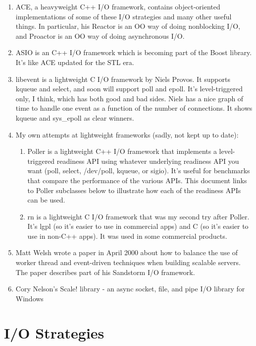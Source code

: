 \documentclass[12pt, twoside, a4paper, xetex]{report}
\begin{document}
	\begin{enumerate}
	
	\item ACE, a heavyweight C++ I/O framework, contains object-oriented implementations of some of these I/O 		
	strategies and many other useful things. In particular, his Reactor is an OO way of doing nonblocking I/O, and 
	Proactor is an OO way of doing asynchronous I/O.
	
	\item ASIO is an C++ I/O framework which is becoming part of the Boost library. It's like ACE updated for the STL era.
	\item libevent is a lightweight C I/O framework by Niels Provos. It supports kqueue and select, and soon will 
	support poll and epoll. It's level-triggered only, I think, which has both good and bad sides. Niels has a nice 
	graph of time to handle one event as a function of the number of connections. It shows kqueue and sys\_epoll as 
	clear winners.
	\item My own attempts at lightweight frameworks (sadly, not kept up to date):
		
		\begin{enumerate}
		\item Poller is a lightweight C++ I/O framework that implements a level-triggered readiness API using 
		whatever underlying readiness API you want (poll, select, /dev/poll, kqueue, or sigio). It's useful for 
		benchmarks that compare the performance of the various APIs. This document links to Poller subclasses below 
		to illustrate how each of the readiness APIs can be used.
		\item rn is a lightweight C I/O framework that was my second try after Poller. It's lgpl (so it's easier to 
		use in commercial apps) and C (so it's easier to use in non-C++ apps). It was used in some commercial 
		products.
		\end{enumerate}
		
	\item Matt Welsh wrote a paper in April 2000 about how to balance the use of worker thread and event-driven 
	techniques when building scalable servers. The paper describes part of his Sandstorm I/O framework.
	\item Cory Nelson's Scale! library - an async socket, file, and pipe I/O library for Windows
	
	\end{enumerate}

\section*{I/O Strategies}
\end{document}
